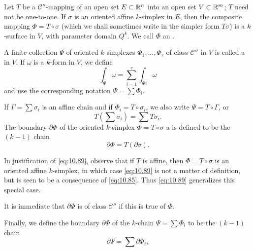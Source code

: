 \begin{mydef}
    \label{mydef:10.30}
    Let $T$ be a $\mathscr{C}''$-mapping of an open set $E \subset {\protect\mathbb R}^n$ into an open set $V \subset {\protect\mathbb R}^m$; 
    $T$ need not be one-to-one. 
    If $\sigma$ is an oriented affine $k$-simplex in $E$, then the composite mapping $\Phi = T \circ \sigma$
    (which we shall sometimes write in the simpler form $T\sigma$) 
    is a $k$-surface in $V$, with parameter domain $Q^k$. 
    We call $\Phi$ an .

    A finite collection $\Psi$ of oriented $k$-simplexes $\Phi_1, ... , \Phi_r$ of class $\mathscr{C}''$ in $V$
    is called a  in $V$. 
    If $\omega$ is a $k$-form in $V$, we define
    \begin{equation}
        \label{eq:10.87}
        \int_{\Psi} \omega = 
        \sum_{i=1}^{r} \int_{\Phi i} \omega
    \end{equation}
    and use the corresponding notation $\Psi = \sum \Phi_i$.

    If $\Gamma = \sum \sigma_i$ is an affine chain 
    and if $\Phi_i = T \circ \sigma_i$, 
    we also write $\Psi = T \circ \Gamma$, 
    or 
    \begin{equation}
        \label{eq:10.88}
        T\left( \sum \sigma_i \right) = \sum T \sigma_i .
    \end{equation}
    The boundary $\partial \Phi$ of the oriented $k$-simplex $\Phi = T \circ \sigma$ a is defined to be the $(k - 1)$ chain
    \begin{equation}
        \label{eq:10.89}
        \partial \Phi = T \left( \partial \sigma \right) .
    \end{equation}

    In justification of \eqref{eq:10.89}, observe that if $T$ is affine, 
    then $\Phi = T \circ \sigma$ is an oriented affine $k$-simplex, 
    in which case \eqref{eq:10.89} is not a matter of definition, 
    but is seen to be a consequence of \eqref{eq:10.85}. 
    Thus \eqref{eq:10.89} generalizes this special case.

    It is immediate that $\partial \Phi$ is of class $\mathscr{C}''$ if this is true of $\Phi$.

    Finally, we define the boundary $\partial \Phi$ of the $k$-chain $\Psi = \sum \Phi_i$ to be the $(k - 1)$ chain
    \begin{equation}
        \label{eq:10.90}
        \partial \Psi = \sum \partial \Phi_i ,
    \end{equation}
\end{mydef}


